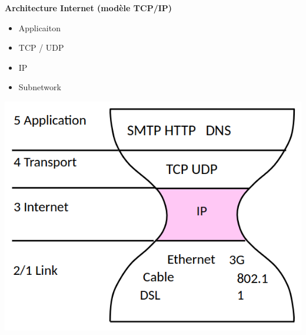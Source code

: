 \documentclass[a4paper, 12pt]{article}
\begin{document}
\textbf{Architecture Internet (modèle TCP/IP)}
\begin{itemize}
    \item Applicaiton
    \item TCP / UDP
    \item IP
    \item Subnetwork
\end{itemize}

\begin{minipage}{0.6\textwidth}
    \includegraphics[scale=0.4]{architecture_internet_sablier.png}
\end{minipage}
\end{document}
